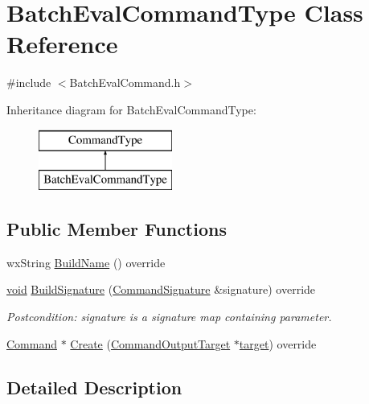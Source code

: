 \hypertarget{class_batch_eval_command_type}{}\section{Batch\+Eval\+Command\+Type Class Reference}
\label{class_batch_eval_command_type}


{\ttfamily \#include $<$Batch\+Eval\+Command.\+h$>$}

Inheritance diagram for Batch\+Eval\+Command\+Type\+:\begin{figure}[H]
\begin{center}
\leavevmode
\includegraphics[height=2.000000cm]{class_batch_eval_command_type}
\end{center}
\end{figure}
\subsection*{Public Member Functions}
\begin{DoxyCompactItemize}
\item 
wx\+String \hyperlink{class_batch_eval_command_type_a50afe7f1b0be0c294cb3c622aec30f4d}{Build\+Name} () override
\item 
\hyperlink{sound_8c_ae35f5844602719cf66324f4de2a658b3}{void} \hyperlink{class_batch_eval_command_type_a02ede3c8a62b3a687c4404b993b2e61d}{Build\+Signature} (\hyperlink{class_command_signature}{Command\+Signature} \&signature) override
\begin{DoxyCompactList}\small\item\em Postcondition\+: signature is a \textquotesingle{}signature\textquotesingle{} map containing parameter. \end{DoxyCompactList}\item 
\hyperlink{class_command}{Command} $\ast$ \hyperlink{class_batch_eval_command_type_a3297ba7eee299894ad5640d7df9ea94b}{Create} (\hyperlink{class_command_output_target}{Command\+Output\+Target} $\ast$\hyperlink{lib_2expat_8h_a15a257516a87decb971420e718853137}{target}) override
\end{DoxyCompactItemize}


\subsection{Detailed Description}


